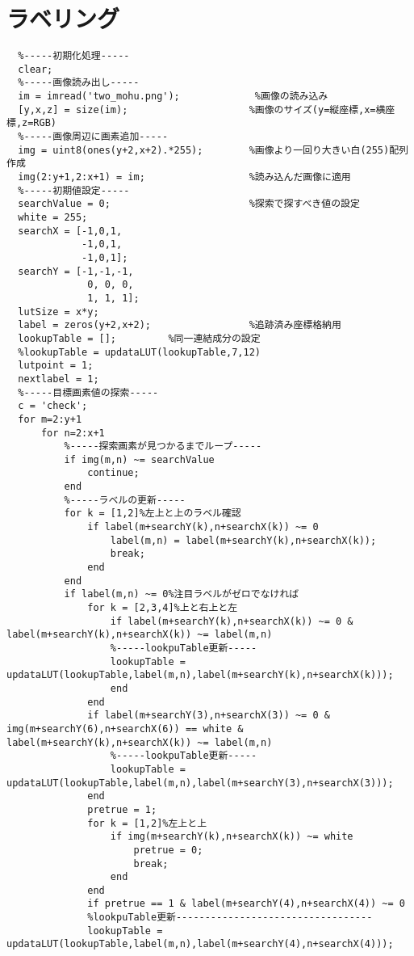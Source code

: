 \documentclass[a4j]{jarticle}
\begin{document}
\section{ラベリング}
\begin{verbatim}
  %-----初期化処理-----
  clear;
  %-----画像読み出し-----
  im = imread('two_mohu.png');             %画像の読み込み
  [y,x,z] = size(im);                     %画像のサイズ(y=縦座標,x=横座標,z=RGB)
  %-----画像周辺に画素追加-----
  img = uint8(ones(y+2,x+2).*255);        %画像より一回り大きい白(255)配列作成
  img(2:y+1,2:x+1) = im;                  %読み込んだ画像に適用
  %-----初期値設定-----
  searchValue = 0;                        %探索で探すべき値の設定
  white = 255;
  searchX = [-1,0,1,
             -1,0,1,
             -1,0,1];
  searchY = [-1,-1,-1,
              0, 0, 0,
              1, 1, 1];
  lutSize = x*y;
  label = zeros(y+2,x+2);                 %追跡済み座標格納用
  lookupTable = [];         %同一連結成分の設定
  %lookupTable = updataLUT(lookupTable,7,12)
  lutpoint = 1;
  nextlabel = 1;
  %-----目標画素値の探索-----
  c = 'check';
  for m=2:y+1
      for n=2:x+1
          %-----探索画素が見つかるまでループ-----
          if img(m,n) ~= searchValue
              continue;
          end
          %-----ラベルの更新-----
          for k = [1,2]%左上と上のラベル確認
              if label(m+searchY(k),n+searchX(k)) ~= 0
                  label(m,n) = label(m+searchY(k),n+searchX(k));
                  break;
              end
          end
          if label(m,n) ~= 0%注目ラベルがゼロでなければ
              for k = [2,3,4]%上と右上と左
                  if label(m+searchY(k),n+searchX(k)) ~= 0 & label(m+searchY(k),n+searchX(k)) ~= label(m,n)
                  %-----lookpuTable更新-----
                  lookupTable = updataLUT(lookupTable,label(m,n),label(m+searchY(k),n+searchX(k)));
                  end
              end
              if label(m+searchY(3),n+searchX(3)) ~= 0 & img(m+searchY(6),n+searchX(6)) == white & label(m+searchY(k),n+searchX(k)) ~= label(m,n)
                  %-----lookpuTable更新-----
                  lookupTable = updataLUT(lookupTable,label(m,n),label(m+searchY(3),n+searchX(3)));
              end
              pretrue = 1;
              for k = [1,2]%左上と上
                  if img(m+searchY(k),n+searchX(k)) ~= white
                      pretrue = 0;
                      break;
                  end
              end
              if pretrue == 1 & label(m+searchY(4),n+searchX(4)) ~= 0
              %lookpuTable更新----------------------------------
              lookupTable = updataLUT(lookupTable,label(m,n),label(m+searchY(4),n+searchX(4)));

\end{verbatim}
\end{document}
